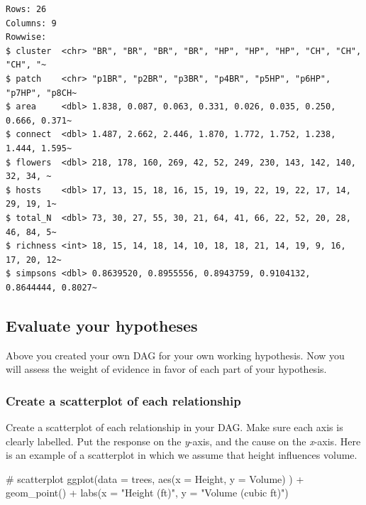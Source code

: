 \documentclass[
  letterpaper,
  DIV=11,
  numbers=noendperiod]{scrreprt}
\newenvironment{Shaded}{\begin{snugshade}}{\end{snugshade}}
\newcommand{\AttributeTok}[1]{\textcolor[rgb]{0.40,0.45,0.13}{#1}}
\newcommand{\CommentTok}[1]{\textcolor[rgb]{0.37,0.37,0.37}{#1}}
\newcommand{\FunctionTok}[1]{\textcolor[rgb]{0.28,0.35,0.67}{#1}}
\newcommand{\NormalTok}[1]{\textcolor[rgb]{0.00,0.23,0.31}{#1}}
\newcommand{\SpecialCharTok}[1]{\textcolor[rgb]{0.37,0.37,0.37}{#1}}
\newcommand{\StringTok}[1]{\textcolor[rgb]{0.13,0.47,0.30}{#1}}
\begin{document}
\begin{verbatim}
Rows: 26
Columns: 9
Rowwise: 
$ cluster  <chr> "BR", "BR", "BR", "BR", "HP", "HP", "HP", "CH", "CH", "CH", "~
$ patch    <chr> "p1BR", "p2BR", "p3BR", "p4BR", "p5HP", "p6HP", "p7HP", "p8CH~
$ area     <dbl> 1.838, 0.087, 0.063, 0.331, 0.026, 0.035, 0.250, 0.666, 0.371~
$ connect  <dbl> 1.487, 2.662, 2.446, 1.870, 1.772, 1.752, 1.238, 1.444, 1.595~
$ flowers  <dbl> 218, 178, 160, 269, 42, 52, 249, 230, 143, 142, 140, 32, 34, ~
$ hosts    <dbl> 17, 13, 15, 18, 16, 15, 19, 19, 22, 19, 22, 17, 14, 29, 19, 1~
$ total_N  <dbl> 73, 30, 27, 55, 30, 21, 64, 41, 66, 22, 52, 20, 28, 46, 84, 5~
$ richness <int> 18, 15, 14, 18, 14, 10, 18, 18, 21, 14, 19, 9, 16, 17, 20, 12~
$ simpsons <dbl> 0.8639520, 0.8955556, 0.8943759, 0.9104132, 0.8644444, 0.8027~
\end{verbatim}

\subsection{Evaluate your hypotheses}\label{evaluate-your-hypotheses}

Above you created your own DAG for your own working hypothesis. Now you
will assess the weight of evidence in favor of each part of your
hypothesis.

\subsubsection{Create a scatterplot of each
relationship}\label{create-a-scatterplot-of-each-relationship}

Create a scatterplot of each relationship in your DAG. Make sure each
axis is clearly labelled. Put the response on the \emph{y}-axis, and the
cause on the \emph{x}-axis. Here is an example of a scatterplot in which
we assume that height influences volume.

\begin{Shaded}
\begin{Highlighting}[]
\CommentTok{\# scatterplot}
\FunctionTok{ggplot}\NormalTok{(}\AttributeTok{data =}\NormalTok{ trees, }\FunctionTok{aes}\NormalTok{(}\AttributeTok{x =}\NormalTok{ Height, }\AttributeTok{y =}\NormalTok{ Volume) ) }\SpecialCharTok{+}
         \FunctionTok{geom\_point}\NormalTok{() }\SpecialCharTok{+}
         \FunctionTok{labs}\NormalTok{(}\AttributeTok{x =} \StringTok{"Height (ft)"}\NormalTok{,}
              \AttributeTok{y =} \StringTok{"Volume (cubic ft)"}\NormalTok{)}
\end{Highlighting}
\end{Shaded}
\end{document}
